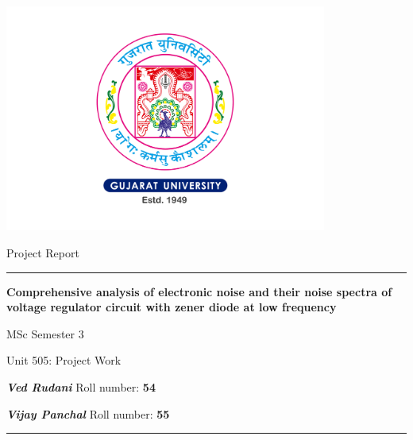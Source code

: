 



\parbox[h]{.8\textwidth}{\centering
\parbox[h]{.75\textwidth}{\centering\includegraphics[width=300pt]{GUlogo.pdf}}
    \parbox[b]{.75\textwidth}{\centering\Huge Project Report \par}\vskip10pt
    \parbox[b]{.75\textwidth}{\centering\hrule height 2pt \vskip50pt\Huge\textbf{Comprehensive analysis of electronic noise and their noise spectra of voltage regulator circuit with zener diode at low frequency}\par}\vskip50pt
   \parbox[b]{.75\textwidth}{\centering \LARGE MSc Semester $3$}\vskip7pt
    \parbox[b]{.75\textwidth}{\centering \large Unit 505:  Project Work}\vskip30pt 

    \parbox[b]{.75\textwidth}{\centering\normalsize \textbf{\emph{Ved Rudani}}   Roll number: \textbf{54}\par}\vskip2pt
    \parbox[b]{.75\textwidth}{\centering\normalsize \textbf{\emph{Vijay Panchal}}  Roll number: \textbf{55}\par \vskip50pt\hrule height 2pt}\vskip10pt
   }

